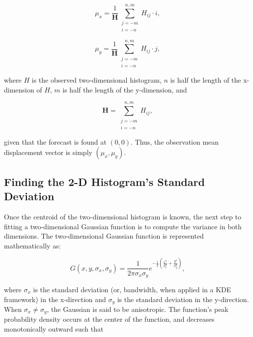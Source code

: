     \begin{equation}
        \label{mux}
        \mu_x = \frac{1}{\mathbf{H}} \sum\limits_{\substack{j=-m \\ i=-n}}^{n,m}H_{ij} \cdot i,
    \end{equation}

    \begin{equation}
        \label{muy}
        \mu_y = \frac{1}{\mathbf{H}} \sum\limits_{\substack{j=-m \\ i=-n}}^{n,m}H_{ij} \cdot j,
    \end{equation}

\noindent where $H$ is the observed two-dimensional histogram, $n$ is half the length of the x-dimension of $H$, $m$ is half the length of the y-dimension, and

    \begin{equation}
        \mathbf{H} = \sum\limits_{\substack{j=-m \\ i=-n}}^{n,m} H_{ij},
    \end{equation}

\noindent given that the forecast is found at $(0, 0)$.
Thus, the observation mean displacement vector is simply $(\mu_x, \mu_y)$.




\subsection{Finding the 2-D Histogram's Standard Deviation}
\label{std}

Once the centroid of the two-dimensional histogram is known, the next step to fitting a two-dimensional Gaussian function is to compute the variance in both dimensions.
The two-dimensional Gaussian function is represented mathematically as:

    \begin{equation}
        \label{2DGauss}
        G(x, y, \sigma_x, \sigma_y) = \frac{1}{2 \pi \sigma_x \sigma_y} e^{- \frac{1}{2} \left( \frac{x^2}{\sigma_x^2} + \frac{y^2}{\sigma_y^2} \right)},
    \end{equation}

\noindent where $\sigma_x$ is the standard deviation (or, bandwidth, when applied in a KDE framework) in the x-direction and $\sigma_y$ is the standard deviation in the y-direction.
When $\sigma_x \neq \sigma_y$, the Gaussian is said to be anisotropic.
The function's peak probability density occurs at the center of the function, and decreases monotonically outward such that


